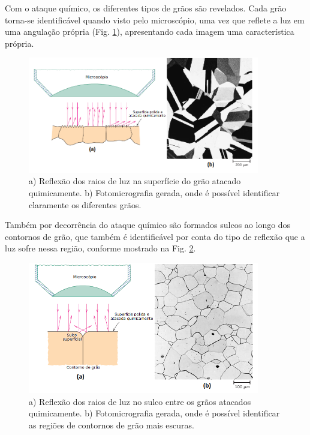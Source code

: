 \documentclass[
12pt,
openany, %
oneside, %
a4paper,			
english,			
brazil			        %
]{abntbibufjf}
\begin{document}
	Com o ataque químico, os diferentes tipos de grãos são revelados. Cada grão torna-se identificável quando visto pelo microscópio, uma vez que reflete a luz em uma angulação própria (Fig. \ref{fig:ataque_grao}), apresentando cada imagem uma característica própria. 
	
	\begin{figure}[H]
		\centering
		\includegraphics[width=0.90\textwidth]{ataque_grao}
		\caption{a) Reflexão dos raios de luz na superfície do grão atacado quimicamente. b) Fotomicrografia gerada, onde é possível identificar claramente os diferentes grãos. \cite{callister2011materials}}
		\label{fig:ataque_grao}
	\end{figure}

	Também por decorrência do ataque químico são formados sulcos ao longo dos contornos de grão, que também é identificável por conta do tipo de reflexão que a luz sofre nessa região, conforme mostrado na Fig. \ref{fig:ataque_contorno}.
	
	\begin{figure}[H]
		\centering
		\includegraphics[width=0.9\textwidth]{ataque_contorno}
		\caption{a) Reflexão dos raios de luz no sulco entre os grãos atacados quimicamente. b) Fotomicrografia gerada, onde é possível identificar as regiões de contornos de grão mais escuras. \cite{callister2011materials}}
		\label{fig:ataque_contorno}
	\end{figure}
\end{document}
